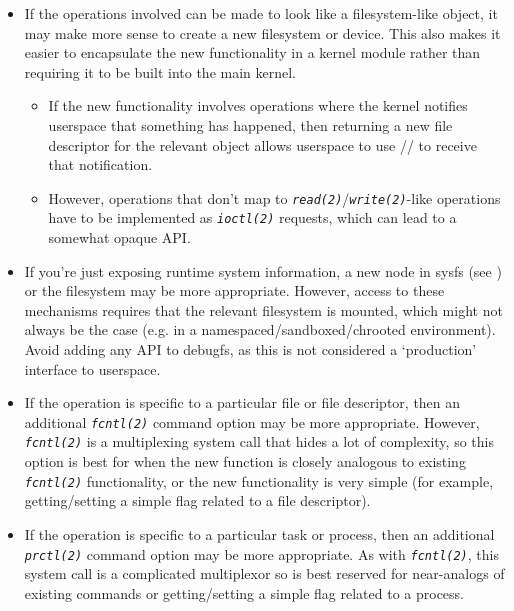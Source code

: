 \documentclass[a4paper,8pt,english]{sphinxmanual}
\begin{document}
\begin{itemize}
\item {} 
If the operations involved can be made to look like a filesystem-like
object, it may make more sense to create a new filesystem or device.  This
also makes it easier to encapsulate the new functionality in a kernel module
rather than requiring it to be built into the main kernel.
\begin{itemize}
\item {} 
If the new functionality involves operations where the kernel notifies
userspace that something has happened, then returning a new file
descriptor for the relevant object allows userspace to use
// to receive that notification.

\item {} 
However, operations that don't map to
\emph{\texttt{read(2)}}/\emph{\texttt{write(2)}}-like operations
have to be implemented as \emph{\texttt{ioctl(2)}} requests, which can lead
to a somewhat opaque API.

\end{itemize}

\item {} 
If you're just exposing runtime system information, a new node in sysfs
(see ) or the  filesystem may
be more appropriate.  However, access to these mechanisms requires that the
relevant filesystem is mounted, which might not always be the case (e.g.
in a namespaced/sandboxed/chrooted environment).  Avoid adding any API to
debugfs, as this is not considered a `production' interface to userspace.

\item {} 
If the operation is specific to a particular file or file descriptor, then
an additional \emph{\texttt{fcntl(2)}} command option may be more appropriate.  However,
\emph{\texttt{fcntl(2)}} is a multiplexing system call that hides a lot of complexity, so
this option is best for when the new function is closely analogous to
existing \emph{\texttt{fcntl(2)}} functionality, or the new functionality is very simple
(for example, getting/setting a simple flag related to a file descriptor).

\item {} 
If the operation is specific to a particular task or process, then an
additional \emph{\texttt{prctl(2)}} command option may be more appropriate.  As
with \emph{\texttt{fcntl(2)}}, this system call is a complicated multiplexor so
is best reserved for near-analogs of existing  commands or
getting/setting a simple flag related to a process.

\end{itemize}
\end{document}
